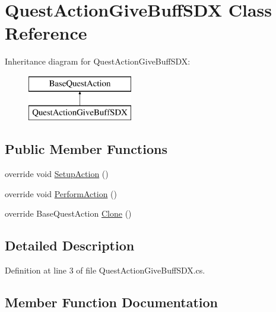 \hypertarget{class_quest_action_give_buff_s_d_x}{}\section{Quest\+Action\+Give\+Buff\+S\+DX Class Reference}
\label{class_quest_action_give_buff_s_d_x}
Inheritance diagram for Quest\+Action\+Give\+Buff\+S\+DX\+:\begin{figure}[H]
\begin{center}
\leavevmode
\includegraphics[height=2.000000cm]{dd/d37/class_quest_action_give_buff_s_d_x}
\end{center}
\end{figure}
\subsection*{Public Member Functions}
\begin{DoxyCompactItemize}
\item 
override void \mbox{\hyperlink{class_quest_action_give_buff_s_d_x_ac8a945f1dbf6614856c5d9f02a76d20b}{Setup\+Action}} ()
\item 
override void \mbox{\hyperlink{class_quest_action_give_buff_s_d_x_af255a6a4bd5e446371d231c776413ce0}{Perform\+Action}} ()
\item 
override Base\+Quest\+Action \mbox{\hyperlink{class_quest_action_give_buff_s_d_x_ab71ede5cd8e876a5eb1bfe3683a0187b}{Clone}} ()
\end{DoxyCompactItemize}


\subsection{Detailed Description}


Definition at line 3 of file Quest\+Action\+Give\+Buff\+S\+D\+X.\+cs.



\subsection{Member Function Documentation}
\mbox{\label{class_quest_action_give_buff_s_d_x_ab71ede5cd8e876a5eb1bfe3683a0187b}} 
